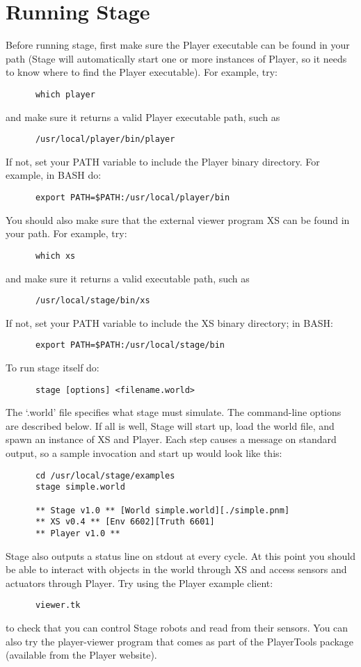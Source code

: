 \documentclass[11pt]{report}
\begin{document}
  \section{Running Stage}

    Before running stage, first make sure the Player executable can be
    found in your path (Stage will automatically start one or more
    instances of Player, so it needs to know where to find the Player
    executable).
    For example, try:
      \begin{verbatim}
      which player
      \end{verbatim}
    and make sure it returns a valid Player executable path, such as
      \begin{verbatim}
      /usr/local/player/bin/player
      \end{verbatim}
    If not, set your PATH variable to include the Player binary directory. 
    For example, in BASH do:
      \begin{verbatim}  
      export PATH=$PATH:/usr/local/player/bin
      \end{verbatim}  
    You should also make sure that the external viewer program XS
    can be found in your path.
    For example, try:
      \begin{verbatim}
      which xs
      \end{verbatim}
    and make sure it returns a valid executable path, such as
      \begin{verbatim}
      /usr/local/stage/bin/xs
      \end{verbatim}
    If not, set your PATH variable to include the XS binary directory;
    in BASH:
      \begin{verbatim}  
      export PATH=$PATH:/usr/local/stage/bin
      \end{verbatim}  
    To run stage itself do: 
      \begin{verbatim} 
      stage [options] <filename.world> 
      \end{verbatim} 
    The `.world' file specifies what stage must simulate. The
    command-line options are described below. If all is well, Stage
    will start up, load the world file, and spawn an instance of XS
    and Player. Each step causes a message on standard output, so a
    sample invocation and start up would look like this:
      \begin{verbatim}
      cd /usr/local/stage/examples
      stage simple.world 
 
      ** Stage v1.0 ** [World simple.world][./simple.pnm]        
      ** XS v0.4 ** [Env 6602][Truth 6601]
      ** Player v1.0 **
      \end{verbatim}
    Stage also outputs a status line on stdout at every cycle.  At
    this point you should be able to interact with objects in the
    world through XS and access sensors and actuators through
    Player. 
    Try using the Player example client:
      \begin{verbatim}
      viewer.tk
      \end{verbatim}
    to check that you can control Stage robots and read from their
    sensors. 
    You can also try the player-viewer program that comes as part of the
    PlayerTools package (available from the Player website).
\end{document}
